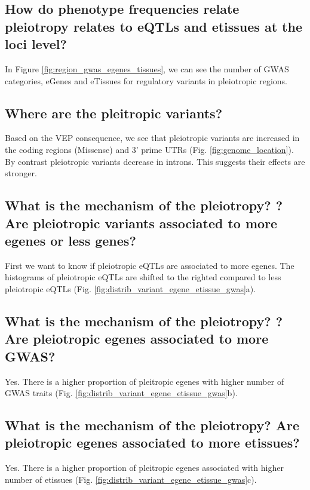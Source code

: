 \subsection*{How do phenotype frequencies relate pleiotropy relates to eQTLs and etissues at the loci level?}

In Figure \ref{fig:region_gwas_egenes_tissues}, we can see the number of GWAS categories, eGenes and eTissues for regulatory variants in pleiotropic regions.


\subsection*{Where are the pleitropic variants?}

Based on the VEP consequence, we see that pleiotropic variants are increased in the coding regions (Missense) and 3' prime UTRs (Fig. \ref{fig:genome_location}).
By contrast pleiotropic variants decrease in introns.
This suggests their effects are stronger.

\subsection*{What is the mechanism of the pleiotropy? ? Are pleiotropic variants associated to more egenes or less genes?}

First we want to know if pleiotropic eQTLs are associated to more egenes.
The histograms of pleiotropic eQTLs are shifted to the righted compared to less pleiotropic eQTLs (Fig. \ref{fig:distrib_variant_egene_etissue_gwas}a).




\subsection*{What is the mechanism of the pleiotropy? ? Are pleiotropic egenes associated to more GWAS?}

Yes. There is a higher proportion of pleitropic egenes with higher number of GWAS traits (Fig. \ref{fig:distrib_variant_egene_etissue_gwas}b).

\subsection*{What is the mechanism of the pleiotropy? Are pleiotropic egenes associated to more etissues?}

Yes. There is a higher proportion of pleitropic egenes associated with higher number of etissues (Fig. \ref{fig:distrib_variant_egene_etissue_gwas}c).

